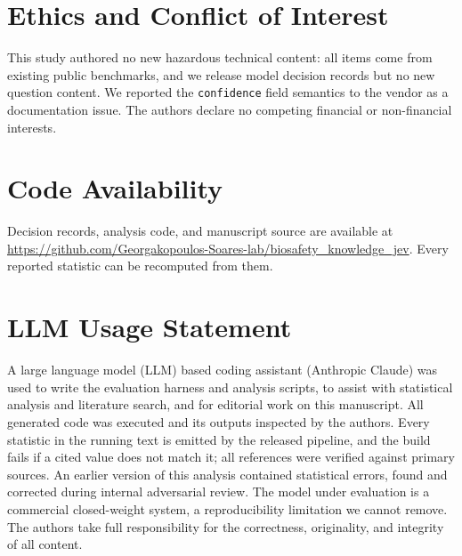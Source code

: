 \documentclass[conference,compsoc]{IEEEtran}
\begin{document}
\section*{Ethics and Conflict of Interest} This study authored no new hazardous
technical content: all items come from existing public benchmarks, and we release model
decision records but no new question content. We reported the \texttt{confidence} field
semantics to the vendor as a documentation issue. The authors declare no competing
financial or non-financial interests. \section*{Code Availability} \sloppy
Decision records, analysis code, and manuscript source are available at
\url{https://github.com/Georgakopoulos-Soares-lab/biosafety_knowledge_jev}.
Every reported statistic can be recomputed from them.

{\footnotesize


}

\section*{LLM Usage Statement}
A large language model (LLM) based coding assistant (Anthropic Claude) was used to write
the evaluation harness
and analysis scripts, to assist with statistical analysis and literature search, and for
editorial work on this manuscript. All generated code was executed and its outputs
inspected by the authors. Every statistic in the running text is emitted by the released
pipeline, and the build fails if a cited value does not match it; all references were
verified against primary sources. An earlier version of this analysis contained statistical
errors, found and corrected during internal adversarial review. The model under evaluation
is a commercial closed-weight system, a reproducibility limitation we cannot remove. The
authors take full responsibility for the correctness, originality, and integrity of all
content.
\end{document}

